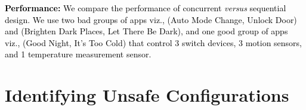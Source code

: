 \textcolor{black}{{\bf Performance:}
We compare the performance of concurrent \textit{versus} sequential design.
We use two bad groups of apps viz., (Auto Mode Change, Unlock Door) and (Brighten Dark Places, Let There Be Dark),
and one good group of apps viz., (Good Night, It's Too Cold) that control 3 switch devices,
3 motion sensors, and 1 temperature measurement sensor.}

\section{Identifying Unsafe Configurations}

